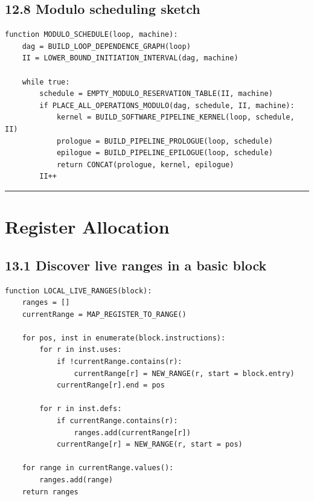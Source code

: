 \documentclass[10pt,letterpaper]{article}
\begin{document}
\subsection*{12.8 Modulo scheduling sketch}

\begin{verbatim}
function MODULO_SCHEDULE(loop, machine):
    dag = BUILD_LOOP_DEPENDENCE_GRAPH(loop)
    II = LOWER_BOUND_INITIATION_INTERVAL(dag, machine)

    while true:
        schedule = EMPTY_MODULO_RESERVATION_TABLE(II, machine)
        if PLACE_ALL_OPERATIONS_MODULO(dag, schedule, II, machine):
            kernel = BUILD_SOFTWARE_PIPELINE_KERNEL(loop, schedule, II)
            prologue = BUILD_PIPELINE_PROLOGUE(loop, schedule)
            epilogue = BUILD_PIPELINE_EPILOGUE(loop, schedule)
            return CONCAT(prologue, kernel, epilogue)
        II++
\end{verbatim}

\medskip\hrule\medskip

\clearpage
\section{Register Allocation}

\subsection*{13.1 Discover live ranges in a basic block}

\begin{verbatim}
function LOCAL_LIVE_RANGES(block):
    ranges = []
    currentRange = MAP_REGISTER_TO_RANGE()

    for pos, inst in enumerate(block.instructions):
        for r in inst.uses:
            if !currentRange.contains(r):
                currentRange[r] = NEW_RANGE(r, start = block.entry)
            currentRange[r].end = pos

        for r in inst.defs:
            if currentRange.contains(r):
                ranges.add(currentRange[r])
            currentRange[r] = NEW_RANGE(r, start = pos)

    for range in currentRange.values():
        ranges.add(range)
    return ranges
\end{verbatim}
\end{document}
